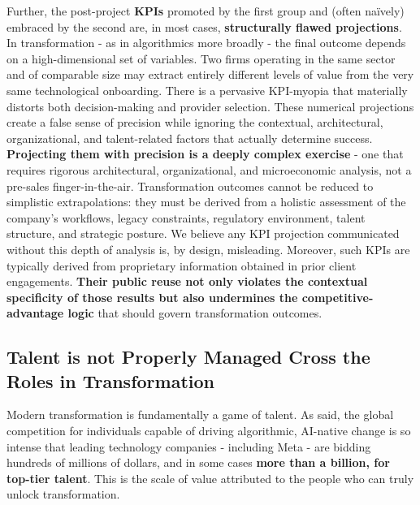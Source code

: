 \documentclass{article}
\begin{document}
Further, the post-project \textbf{KPIs} promoted by the first group and (often naïvely) embraced by the second are, in most cases, \textbf{structurally flawed projections}. In transformation - as in algorithmics more broadly - the final outcome depends on a high-dimensional set of variables. Two firms operating in the same sector and of comparable size may extract entirely different levels of value from the very same technological onboarding. There is a pervasive KPI-myopia that materially distorts both decision-making and provider selection. These numerical projections create a false sense of precision while ignoring the contextual, architectural, organizational, and talent-related factors that actually determine success. \textbf{Projecting them with precision is a deeply complex exercise} - one that requires rigorous architectural, organizational, and microeconomic analysis, not a pre-sales finger-in-the-air. Transformation outcomes cannot be reduced to simplistic extrapolations: they must be derived from a holistic assessment of the company’s workflows, legacy constraints, regulatory environment, talent structure, and strategic posture. We believe any KPI projection communicated without this depth of analysis is, by design, misleading. Moreover, such KPIs are typically derived from proprietary information obtained in prior client engagements. \textbf{Their public reuse not only violates the contextual specificity of those results but also undermines the competitive-advantage logic} that should govern transformation outcomes.


\subsection{Talent is not Properly Managed Cross the Roles in Transformation}
\label{subsection: Talent is not Properly Managed cross the Roles in Transformation}

Modern transformation is fundamentally a game of talent. As said, the global competition for individuals capable of driving algorithmic, AI-native change is so intense that leading technology companies - including Meta - are bidding hundreds of millions of dollars, and in some cases \textbf{more than a billion, for top-tier talent}. This is the scale of value attributed to the people who can truly unlock transformation.\\
\end{document}
